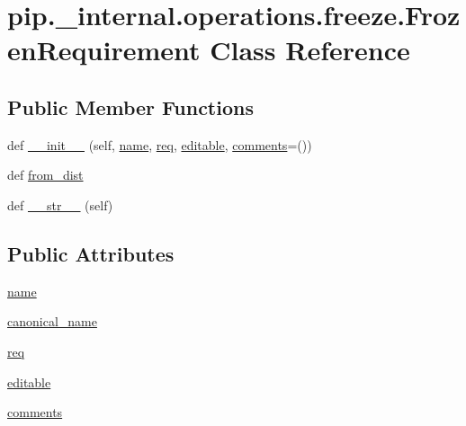 \hypertarget{classpip_1_1__internal_1_1operations_1_1freeze_1_1FrozenRequirement}{}\section{pip.\+\_\+internal.\+operations.\+freeze.\+Frozen\+Requirement Class Reference}
\label{classpip_1_1__internal_1_1operations_1_1freeze_1_1FrozenRequirement}
\subsection*{Public Member Functions}
\begin{DoxyCompactItemize}
\item 
def \hyperlink{classpip_1_1__internal_1_1operations_1_1freeze_1_1FrozenRequirement_a084ff08881bda1ab0d8bed39142382d0}{\+\_\+\+\_\+init\+\_\+\+\_\+} (self, \hyperlink{classpip_1_1__internal_1_1operations_1_1freeze_1_1FrozenRequirement_a026a2d38b53406c4706d3caec7d8dc88}{name}, \hyperlink{classpip_1_1__internal_1_1operations_1_1freeze_1_1FrozenRequirement_a1d9481e3ef55293de239f628e482f9a1}{req}, \hyperlink{classpip_1_1__internal_1_1operations_1_1freeze_1_1FrozenRequirement_a37fb8ac1cf88ce9feb08f67c248a7d59}{editable}, \hyperlink{classpip_1_1__internal_1_1operations_1_1freeze_1_1FrozenRequirement_a3c229c4d43becafd38230663449ff4d4}{comments}=())
\item 
def \hyperlink{classpip_1_1__internal_1_1operations_1_1freeze_1_1FrozenRequirement_aa602f5eeb51256eb0e87cb3f8663e1e8}{from\+\_\+dist}
\item 
def \hyperlink{classpip_1_1__internal_1_1operations_1_1freeze_1_1FrozenRequirement_a317c1e8fca63497fefdca89b8b6abae8}{\+\_\+\+\_\+str\+\_\+\+\_\+} (self)
\end{DoxyCompactItemize}
\subsection*{Public Attributes}
\begin{DoxyCompactItemize}
\item 
\hyperlink{classpip_1_1__internal_1_1operations_1_1freeze_1_1FrozenRequirement_a026a2d38b53406c4706d3caec7d8dc88}{name}
\item 
\hyperlink{classpip_1_1__internal_1_1operations_1_1freeze_1_1FrozenRequirement_aa82feb05685dce48c67daf8d269e1eb7}{canonical\+\_\+name}
\item 
\hyperlink{classpip_1_1__internal_1_1operations_1_1freeze_1_1FrozenRequirement_a1d9481e3ef55293de239f628e482f9a1}{req}
\item 
\hyperlink{classpip_1_1__internal_1_1operations_1_1freeze_1_1FrozenRequirement_a37fb8ac1cf88ce9feb08f67c248a7d59}{editable}
\item 
\hyperlink{classpip_1_1__internal_1_1operations_1_1freeze_1_1FrozenRequirement_a3c229c4d43becafd38230663449ff4d4}{comments}
\end{DoxyCompactItemize}


